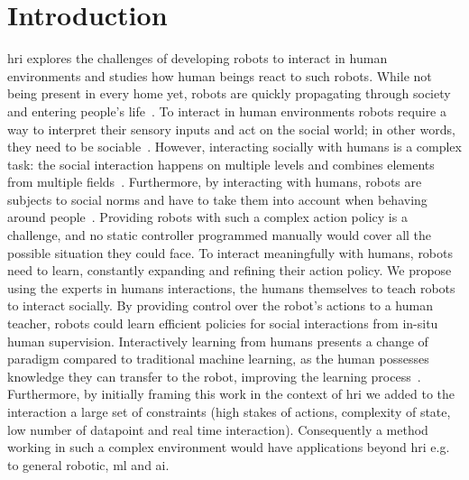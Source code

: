 \chapter{Introduction} \label{chap:intro}
\graphicspath{{images/intro/}}
\glsresetall


\gls{hri} explores the challenges of developing robots to interact in human environments and studies how human beings react to such robots. While not being present in every home yet, robots are quickly propagating through society and entering people's life~\citep{friedman2003hardware,forlizzi2006service}.
To interact in human environments robots require a way to interpret their sensory inputs and act on the social world; in other words, they need to be sociable~\citep{breazeal2004designing}. However, interacting socially with humans is a complex task: the social interaction happens on multiple levels and combines elements from multiple fields~\citep{fong2003survey}. Furthermore, by interacting with humans, robots are subjects to social norms and have to take them into account when behaving around people~\citep{bartneck2004design}. Providing robots with such a complex action policy is a challenge, and no static controller programmed manually would cover all the possible situation they could face. To interact meaningfully with humans, robots need to learn, constantly expanding and refining their action policy. We propose using the experts in humans interactions, the humans themselves to teach robots to interact socially. By providing control over the robot's actions to a human teacher, robots could learn efficient policies for social interactions from in-situ human supervision. Interactively learning from humans presents a change of paradigm compared to traditional machine learning, as the human possesses knowledge they can transfer to the robot, improving the learning process~\citep{fails2003interactive,amershi2014power}. Furthermore, by initially framing this work in the context of \gls{hri} we added to the interaction a large set of constraints (high stakes of actions, complexity of state, low number of datapoint and real time interaction). Consequently a method working in such a complex environment would have applications beyond \gls{hri} e.g. to general robotic, \gls{ml} and \gls{ai}.

